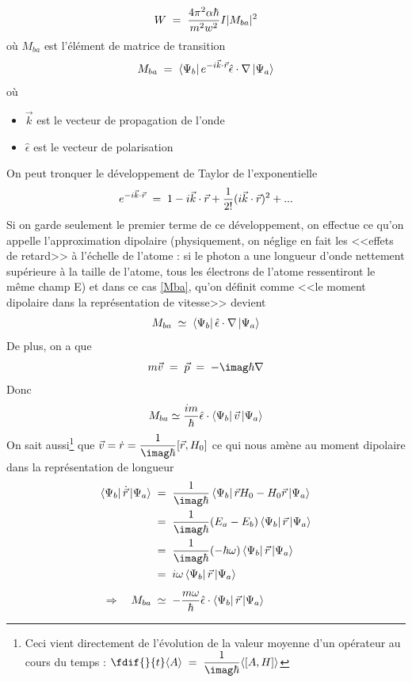 \begin{equation}
    W\; = \; \dfrac{4\pi^2 \alpha \hbar}{m^2 w^2}I|M_{ba}|^2
\end{equation}
où $M_{ba}$ est l'élément de matrice de transition
\begin{equation}
    M_{ba}\; = \; \bra{\Psi_b}e^{-i\vec{k}\cdot \vec{r}}\hat{\epsilon}\cdot\nabla \ket{\Psi_a}
    \label{Mba}
\end{equation}
où
\begin{itemize}
    \item $\vec{k}$ est le vecteur de propagation de l'onde
    \item $\hat{\epsilon}$ est le vecteur de polarisation
\end{itemize}
On peut tronquer le développement de Taylor de l'exponentielle
\begin{equation}
    e^{-i\vec{k}\cdot\vec{r}}\; = \; 1-i\vec{k}\cdot\vec{r}+\dfrac{1}{2!}(i\vec{k}\cdot\vec{r})^2+...
    \label{eq:dvpl_expo}
\end{equation}
Si on garde seulement le premier terme de ce développement, on effectue ce qu'on appelle l'approximation dipolaire (physiquement, on néglige en fait les <<effets de retard>> à l'échelle de l'atome : si le photon a une longueur d'onde nettement supérieure à la taille de l'atome, tous les électrons de l'atome ressentiront le même champ E) et dans ce cas \eqref{Mba}, qu'on définit comme <<le moment dipolaire dans la représentation de vitesse>> devient
\[
    M_{ba} \;\simeq\; \bra{\Psi_b}\hat{\epsilon}\cdot\nabla\ket{\Psi_a}
\]
De plus, on a que
\[
    m\vec{v}\eq \vec{p}\eq -\imag\hbar \nabla
\]
Donc
\[
    M_{ba} \simeq \dfrac{im}{\hbar}\hat{\epsilon}\cdot\bra{\Psi_b}\vec{v}\ket{\Psi_a}
\]
On sait aussi\footnote{Ceci vient directement de l'évolution de la valeur moyenne d'un opérateur au cours du temps : $\fdif{}{t}\langle A \rangle \eq \dfrac{1}{\imag\hbar}\langle[A,H] \rangle$} que $\vec{v}=\dot{r}=\dfrac{1}{\imag\hbar}[\vec{r},H_0]$ ce qui nous amène au moment dipolaire dans la représentation de longueur
\begin{align*}
    \bra{\Psi_b}\dot{\vec{r}}\ket{\Psi_a}
    &\eq
    \dfrac{1}{\imag\hbar}\bra{\Psi_b}\vec{r}H_0-H_0\vec{r}\ket{\Psi_a}\\
    &\eq
    \dfrac{1}{\imag\hbar}(E_a-E_b)\bra{\Psi_b}\vec{r}\ket{\Psi_a}\\
    &\eq
    \dfrac{1}{\imag\hbar}(-\hbar \omega)\bra{\Psi_b}\vec{r}\ket{\Psi_a} \\
    &\eq
    i \omega \bra{\Psi_b}\vec{r}\ket{\Psi_a} \\[5pt]
    \Rightarrow \quad M_{ba} &\;\simeq\;
    -\dfrac{m \omega}{\hbar}\hat{\epsilon}\cdot\bra{\Psi_b}\vec{r}\ket{\Psi_a}
\end{align*}
